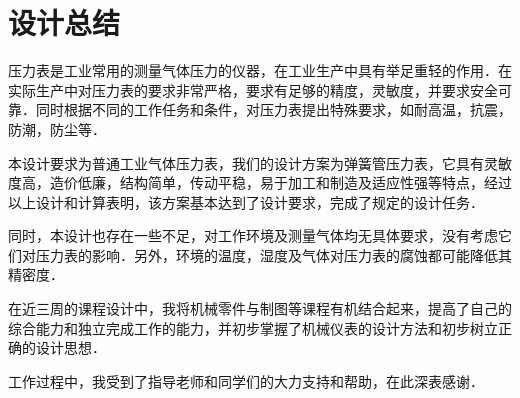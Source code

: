 \section{设计总结}
压力表是工业常用的测量气体压力的仪器，在工业生产中具有举足重轻的作用．在实际生产中对压力表的要求非常严格，要求有足够的精度，灵敏度，并要求安全可靠．同时根据不同的工作任务和条件，对压力表提出特殊要求，如耐高温，抗震，防潮，防尘等．
\newline

本设计要求为普通工业气体压力表，我们的设计方案为弹簧管压力表，它具有灵敏度高，造价低廉，结构简单，传动平稳，易于加工和制造及适应性强等特点，经过以上设计和计算表明，该方案基本达到了设计要求，完成了规定的设计任务．
\newline

同时，本设计也存在一些不足，对工作环境及测量气体均无具体要求，没有考虑它们对压力表的影响．另外，环境的温度，湿度及气体对压力表的腐蚀都可能降低其精密度．
\newline

在近三周的课程设计中，我将机械零件与制图等课程有机结合起来，提高了自己的综合能力和独立完成工作的能力，并初步掌握了机械仪表的设计方法和初步树立正确的设计思想．
\newline

工作过程中，我受到了指导老师和同学们的大力支持和帮助，在此深表感谢．